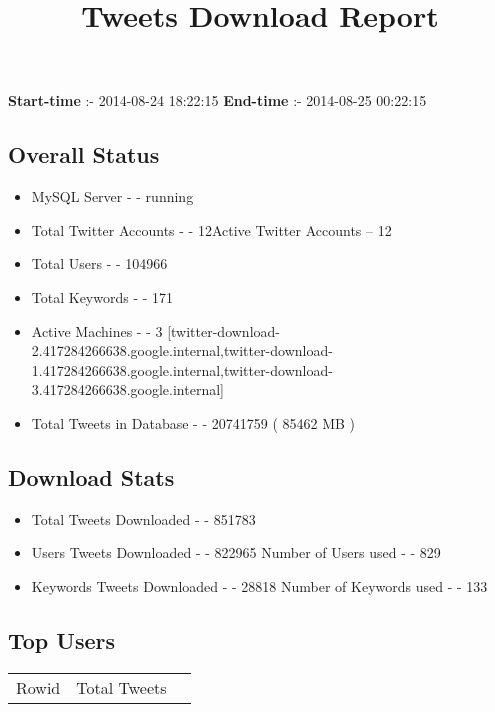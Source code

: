 \documentclass{article}\usepackage[T1]{fontenc}
\begin{document}
\title{\textbf{Tweets Download Report}}
               \date{}
                \maketitle
               \centerline{\textbf{Start-time} :- 2014-08-24 18:22:15 \hspace{40pt} \textbf{End-time} :- 2014-08-25 00:22:15}               \subsection*{Overall Status}                \begin{itemize}                \item MySQL Server - - running               \item Total Twitter Accounts - - 12\newline Active Twitter Accounts -- 12               \item Total Users - - 104966               \item Total Keywords - - 171               \item Active Machines - - 3 [twitter-download-2.417284266638.google.internal,twitter-download-1.417284266638.google.internal,twitter-download-3.417284266638.google.internal]               \item Total Tweets in Database - - 20741759 ( 85462 MB )               \end{itemize}               \subsection*{Download Stats}                \begin{itemize}                \item Total Tweets Downloaded - - 851783               \item Users Tweets Downloaded - - 822965 \newline Number of Users used - - 829               \item Keywords Tweets Downloaded - - 28818 \newline Number of Keywords used - - 133              \end{itemize}              \subsection*{Top Users}\begin{tabular}{|c|c|c|}         \hline         Rowid & Total Tweets \\ 

\end{tabular}
\end{document}
